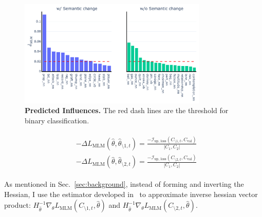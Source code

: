 \begin{figure}[t]
\centering
\includegraphics[width=0.8\textwidth]{../project/src/scale_5000-recursion_depth_10000/influences_binary.pdf}
\caption{\textbf{Predicted Influences.} The red dash lines are the threshold for binary classification.}
\label{fig:binary}
\end{figure}


\begin{align}
\begin{split}
    &-\Delta L_\text{MLM}(\hat{\theta}, \hat{\theta}_{\setminus 1, t}) = \frac{-\mathcal{I}_\text{up, loss}(C_{\setminus 1, t}, C_\text{val})}{|C_1, C_2|} \\ 
    &-\Delta L_\text{MLM}(\hat{\theta}, \hat{\theta}_{\setminus 2, t}) = \frac{-\mathcal{I}_\text{up, loss}(C_{\setminus 2, t}, C_\text{val})}{|C_1, C_2|}    
    \label{eq:influence_fn_mlm}
\end{split}
\end{align}


As mentioned in Sec.~\ref{sec:background}, instead of forming and inverting the Hessian, I use the estimator developed in~\cite{second-order-approx} to approximate inverse hessian vector product: $H^{-1}_{\hat{\theta}} \nabla_\theta L_\text{MLM}(C_{\setminus 1, t}, \hat{\theta})$ and $H^{-1}_{\hat{\theta}} \nabla_\theta L_\text{MLM}(C_{\setminus 2, t}, \hat{\theta})$.

